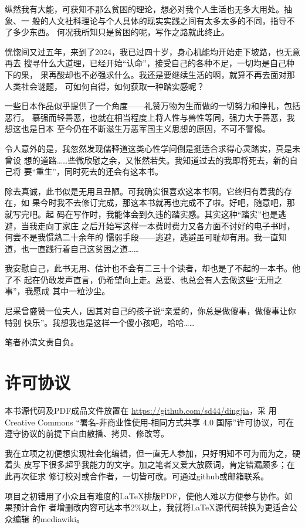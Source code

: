 纵然我有大能，可获知不那么贫困的理论，想必对我个人生活也无多大用处。抽象、一
般的人文社科理论与个人具体的现实实践之间有太多太多的不同，指导不了多少东西。
何况我所知只是贫困的呢，写作之路就此终止。

恍惚间又过五年，来到了2024，我已过四十岁，身心机能均开始走下坡路，也无意再去
搜寻什么大道理，已经开始“认命”，接受自己的各种不足，一切均是自己种下的果，
果再酸却也不必强求什么。我还是要继续生活的啊，就算不再去面对那人类社会谜题，
可如何自得，如何获取一种踏实感呢？

一些日本作品似乎提供了一个角度——礼赞万物为生而做的一切努力和挣扎，包括恶行。
慕强而轻善恶，也就在相当程度上将人性与兽性等同，强力大于善恶，我想这也是日本
至今仍在不断滋生万恶军国主义思想的原因，不可不警惕。

令人意外的是，我忽然发现儒释道这类心性学问倒是挺适合求得心灵踏实，真是未曾设
想的道路……些微欣慰之余，又怅然若失。我知道过去的我即将死去，新的自己将
要“重生”，同时死去的还会有这本书。

除去真诚，此书似是无用且丑陋。可我确实很喜欢这本书啊。它终归有着我的存在，如
果今时我不去修订完成，那这本书就再也完成不了啦。好吧，随意吧，那就写完吧。起
码在写作时，我能体会到久违的踏实感。其实这种“踏实”也是逃避，当我走向丁家庄
之后开始写这样一本费时费力又各方面不讨好的电子书时，何尝不是我惯熟二十余年的
懦弱手段——逃避，逃避虽可耻却有用。我一直知道，也一直践行着自己这贫困之道……

我安慰自己，此书无用、估计也不会有二三十个读者，却也是了不起的一本书。他了不
起在仍敢发声直言，仍希望向上走。总要、也总会有人去做这些“无用之事”，我愿成
其中一粒沙尘。


尼采曾盛赞一位夫人，因其对自己的孩子说“亲爱的，你总是做傻事，做傻事让你特别
快乐”。我想我也是这样一个傻小孩吧，哈哈……

笔者孙滨文责自负。

\section*{许可协议}

本书源代码及PDF成品文件放置在 \url{https://github.com/sd44/dingjia}，采
用 Creative Commons “署名-非商业性使用-相同方式共享 4.0 国际”许可协议，可在
遵守协议的前提下自由散播、拷贝、修改等。

我在立项之初便想实现社会化编辑，但一直无人参加，只好明知不可为而为之，硬着头
皮写下很多超乎我能力的文字。加之笔者又爱大放厥词，肯定错漏颇多；在此再次征求
修订校对或合作者，一切皆可改。可通过github或邮箱联系。

项目之初错用了小众且有难度的\LaTeX 排版PDF，使他人难以方便参与协作。如果预计合作
者增删改内容可达本书2\%以上，我就将\LaTeX 源代码转换为更适合公众编辑
的mediawiki。

